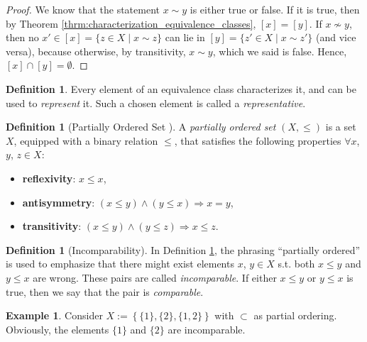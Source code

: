 \documentclass[12pt, a4paper]{article}
\numberwithin{equation}{section}
\theoremstyle{definition}
\theoremstyle{definition}
\newtheorem{defn}[thm]{Definition} %
\newtheorem{exmp}[thm]{Example} %
\begin{document}
	\begin{proof}
		We know that the statement $x\sim y$ is either true or false. If it is true, then by Theorem \ref{thrm:characterization_equivalence_classes}, $[x] = [y]$. If $x\not\sim y$, then no $x'\in [x] = \{z\in X\mid x\sim z\}$ can lie in $[y] = \{z'\in X\mid x\sim z'\}$ (and vice versa), because otherwise, by transitivity, $x\sim y$, which we said is false. Hence, $[x] \cap [y] = \emptyset$.
	\end{proof}

	\begin{defn}
		Every element of an equivalence class characterizes it, and can be used to \textit{represent} it. Such a chosen element is called a \textit{representative}.
	\end{defn}

	\begin{defn}[Partially Ordered Set \cite{kuratowski_zorn_lemma}]\label{partially_ordered_set}
		A \textit{partially ordered set}  $\left(X, \leq\right)$ is a set $X$, equipped with a binary relation $\leq$, that satisfies the following properties $\forall x$, $y$, $z\in X$:
		\begin{itemize}
			\item \textbf{reflexivity}: $x\leq x$, 
			\item \textbf{antisymmetry}: $\left(x\leq y\right) \wedge \left(y\leq x\right) \Rightarrow x = y$, 
			\item \textbf{transitivity}: $\left(x\leq y\right) \wedge \left(y\leq z\right)\Rightarrow x\leq z$. 
		\end{itemize}
	\end{defn}

	\begin{defn}[Incomparability]
		In Definition \ref{partially_ordered_set}, the phrasing \enquote{partially ordered} is used to emphasize that there might exist elements $x$, $y\in X$ s.t. both $x\leq y$ and $y\leq x$ are wrong. These pairs are called \textit{incomparable}. If either $x\leq y$ or $y \leq x$ is true, then we say that the pair is \textit{comparable}. 
	\end{defn}
	
	\begin{exmp}
		Consider $X := \left\{\{1\}, \{2\}, \{1, 2\}\right\}$ with $\subset$ as partial ordering. Obviously, the elements $\{1\}$ and $\{2\}$ are incomparable. 
	\end{exmp}
\end{document}
